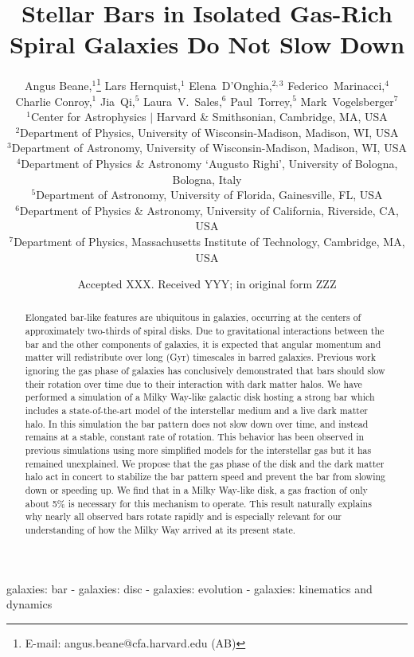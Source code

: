 \documentclass[fleqn,usenatbib]{mnras}
\title[Stellar Bars and Gas]{Stellar Bars in Isolated Gas-Rich Spiral Galaxies Do Not Slow Down}
\author[A. Beane et al.]{Angus Beane,$^{1}$\thanks{E-mail: angus.beane@cfa.harvard.edu (AB)}
Lars Hernquist,$^{1}$
Elena~D'Onghia,$^{2,3}$
Federico~Marinacci,$^{4}$
Charlie Conroy,$^{1}$
Jia~Qi,$^{5}$\newauthor
Laura~V.~Sales,$^{6}$
Paul~Torrey,$^{5}$
Mark~Vogelsberger$^{7}$
\\
$^{1}$Center for Astrophysics $|$ Harvard \& Smithsonian,  Cambridge, MA, USA\\
$^{2}$Department of Physics, University of Wisconsin-Madison, Madison, WI, USA\\
$^{3}$Department of Astronomy, University of Wisconsin-Madison, Madison, WI, USA\\
$^{4}$Department of Physics \& Astronomy `Augusto Righi', University of Bologna, Bologna, Italy\\
$^{5}$Department of Astronomy, University of Florida, Gainesville, FL, USA\\
$^{6}$Department of Physics \& Astronomy, University of California, Riverside, CA, USA\\
$^{7}$Department of Physics, Massachusetts Institute of Technology, Cambridge, MA, USA\\
}
\date{Accepted XXX. Received YYY; in original form ZZZ}
\begin{document}
\label{firstpage}
\pagerange{\pageref{firstpage}--\pageref{lastpage}}
\maketitle

\begin{abstract}
Elongated bar-like features are ubiquitous in galaxies, occurring at the centers
of approximately two-thirds of spiral disks.  Due to gravitational interactions
between the bar and the other components of galaxies, it is expected that
angular momentum and matter will redistribute over long (Gyr) timescales in
barred galaxies. Previous work ignoring the gas phase of galaxies has
conclusively demonstrated that bars should slow their rotation over time due to
their interaction with dark matter halos. We have performed a simulation of a
Milky Way-like galactic disk hosting a strong bar which includes a
state-of-the-art model of the interstellar medium and a live dark matter halo.
In this simulation the bar pattern does not slow down over time, and instead
remains at a stable, constant rate of rotation. This behavior has been observed
in previous simulations using more simplified models for the interstellar gas
but it has remained unexplained. We propose that the gas phase of the disk and
the dark matter halo act in concert to stabilize the bar pattern speed and
prevent the bar from slowing down or speeding up. We find that in a Milky
Way-like disk, a gas fraction of only about 5\% is necessary for this mechanism
to operate. This result naturally explains why nearly all observed bars rotate
rapidly and is especially relevant for our understanding of how the Milky Way
arrived at its present state.
\end{abstract}

\begin{keywords}
galaxies: bar - galaxies: disc - galaxies: evolution - galaxies: kinematics and
dynamics
\end{keywords}


\end{document}
